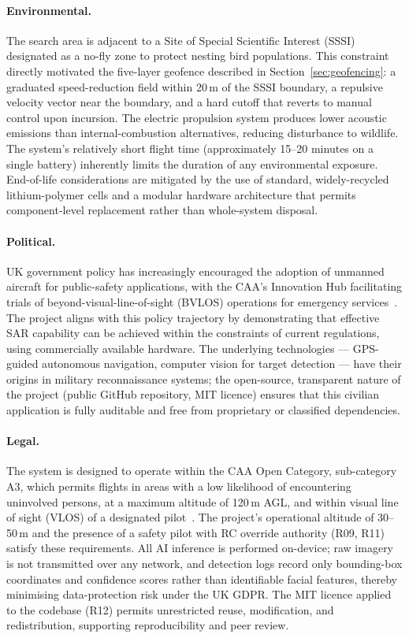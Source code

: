 \paragraph{Environmental.}
The search area is adjacent to a Site of Special Scientific Interest (SSSI) designated as a no-fly zone to protect nesting bird populations. This constraint directly motivated the five-layer geofence described in Section~\ref{sec:geofencing}: a graduated speed-reduction field within 20\,m of the SSSI boundary, a repulsive velocity vector near the boundary, and a hard cutoff that reverts to manual control upon incursion. The electric propulsion system produces lower acoustic emissions than internal-combustion alternatives, reducing disturbance to wildlife. The system's relatively short flight time (approximately 15--20 minutes on a single battery) inherently limits the duration of any environmental exposure. End-of-life considerations are mitigated by the use of standard, widely-recycled lithium-polymer cells and a modular hardware architecture that permits component-level replacement rather than whole-system disposal.

\paragraph{Political.}
UK government policy has increasingly encouraged the adoption of unmanned aircraft for public-safety applications, with the CAA's Innovation Hub facilitating trials of beyond-visual-line-of-sight (BVLOS) operations for emergency services~\cite{caa2024uas}. The project aligns with this policy trajectory by demonstrating that effective SAR capability can be achieved within the constraints of current regulations, using commercially available hardware. The underlying technologies --- GPS-guided autonomous navigation, computer vision for target detection --- have their origins in military reconnaissance systems; the open-source, transparent nature of the project (public GitHub repository, MIT licence) ensures that this civilian application is fully auditable and free from proprietary or classified dependencies.

\paragraph{Legal.}
The system is designed to operate within the CAA Open Category, sub-category A3, which permits flights in areas with a low likelihood of encountering uninvolved persons, at a maximum altitude of 120\,m AGL, and within visual line of sight (VLOS) of a designated pilot~\cite{caa2024uas}. The project's operational altitude of 30--50\,m and the presence of a safety pilot with RC override authority (R09, R11) satisfy these requirements. All AI inference is performed on-device; raw imagery is not transmitted over any network, and detection logs record only bounding-box coordinates and confidence scores rather than identifiable facial features, thereby minimising data-protection risk under the UK GDPR. The MIT licence applied to the codebase (R12) permits unrestricted reuse, modification, and redistribution, supporting reproducibility and peer review.

